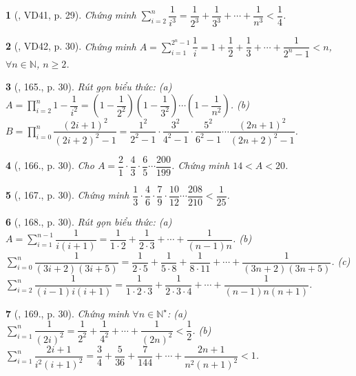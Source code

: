 \documentclass{article}
\newtheorem{baitoan}{}
\begin{document}
\begin{baitoan}[\cite{Binh_Toan_8_tap_1}, VD41, p. 29]
	Chứng minh $\sum_{i=2}^n \dfrac{1}{i^3} = \dfrac{1}{2^3} + \dfrac{1}{3^3} + \cdots + \dfrac{1}{n^3} < \dfrac{1}{4}$.
\end{baitoan}

\begin{baitoan}[\cite{Binh_Toan_8_tap_1}, VD42, p. 30]
	Chứng minh $A = \sum_{i=1}^{2^n - 1} \dfrac{1}{i} = 1 + \dfrac{1}{2} + \dfrac{1}{3} + \cdots + \dfrac{1}{2^n - 1} < n$, $\forall n\in\mathbb{N}$, $n\ge2$.
\end{baitoan}

\begin{baitoan}[\cite{Binh_Toan_8_tap_1}, 165., p. 30]
	Rút gọn biểu thức: (a) $A = \prod_{i=2}^n 1 - \dfrac{1}{i^2} = \left(1 - \dfrac{1}{2^2}\right)\left(1 - \dfrac{1}{3^2}\right)\cdots\left(1 - \dfrac{1}{n^2}\right)$. (b) $B = \prod_{i=0}^n \dfrac{(2i + 1)^2}{(2i + 2)^2 - 1} = \dfrac{1^2}{2^2 - 1}\cdot\dfrac{3^2}{4^2 - 1}\cdot\dfrac{5^2}{6^2 - 1}\cdots\dfrac{(2n + 1)^2}{(2n + 2)^2 - 1}$.
\end{baitoan}

\begin{baitoan}[\cite{Binh_Toan_8_tap_1}, 166., p. 30]
	Cho $A = \dfrac{2}{1}\cdot\dfrac{4}{3}\cdot\dfrac{6}{5}\cdots\dfrac{200}{199}$. Chứng minh $14 < A < 20$.
\end{baitoan}

\begin{baitoan}[\cite{Binh_Toan_8_tap_1}, 167., p. 30]
	Chứng minh $\dfrac{1}{3}\cdot\dfrac{4}{6}\cdot\dfrac{7}{9}\cdot\dfrac{10}{12}\cdots\dfrac{208}{210} < \dfrac{1}{25}$.
\end{baitoan}

\begin{baitoan}[\cite{Binh_Toan_8_tap_1}, 168., p. 30]
	Rút gọn biểu thức: (a) $A = \sum_{i=1}^{n-1} \dfrac{1}{i(i + 1)} = \dfrac{1}{1\cdot2} + \dfrac{1}{2\cdot3} + \cdots + \dfrac{1}{(n - 1)n}$. (b) $\sum_{i=0}^n \dfrac{1}{(3i + 2)(3i + 5)} = \dfrac{1}{2\cdot5} + \dfrac{1}{5\cdot8} + \dfrac{1}{8\cdot11} + \cdots + \dfrac{1}{(3n + 2)(3n + 5)}$. (c) $\sum_{i=2}^n \dfrac{1}{(i - 1)i(i + 1)} = \dfrac{1}{1\cdot2\cdot3} + \dfrac{1}{2\cdot3\cdot4} + \cdots + \dfrac{1}{(n - 1)n(n + 1)}$.
\end{baitoan}

\begin{baitoan}[\cite{Binh_Toan_8_tap_1}, 169., p. 30]
	Chứng minh $\forall n\in\mathbb{N}^\star$: (a) $\sum_{i=1}^n \dfrac{1}{(2i)^2} = \dfrac{1}{2^2} + \dfrac{1}{4^2} + \cdots + \dfrac{1}{(2n)^2} < \dfrac{1}{2}$. (b) $\sum_{i=1}^n \dfrac{2i + 1}{i^2(i + 1)^2} = \dfrac{3}{4} + \dfrac{5}{36} + \dfrac{7}{144} + \cdots + \dfrac{2n + 1}{n^2(n + 1)^2} < 1$.
\end{baitoan}
\end{document}

